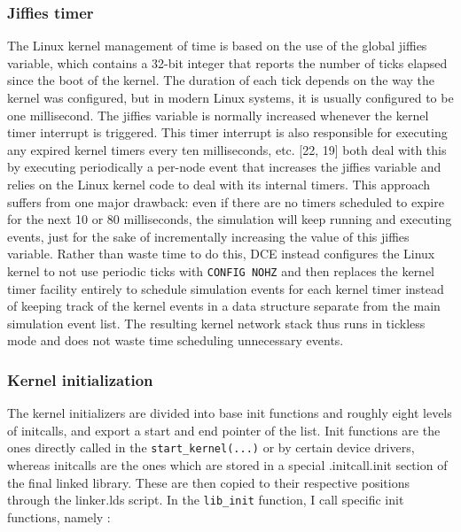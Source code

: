 \documentclass{sig-alternate}
\begin{document}
\subsubsection{Jiffies timer}
The Linux kernel management of time is based on the use of the global jiffies variable,
which contains a 32-bit integer that reports the number of ticks elapsed since the boot of
the kernel. The duration of each tick depends on the way the kernel was configured, but in modern Linux systems, it is usually configured to be one millisecond. The jiffies variable is normally
increased whenever the kernel timer interrupt is triggered. This timer interrupt is also
responsible for executing any expired kernel timers every ten milliseconds, etc.
[22, 19] both deal with this by executing periodically a per-node event that increases
the jiffies variable and relies on the Linux kernel code to deal with its internal timers. This
approach suffers from one major drawback: even if there are no timers scheduled to
expire for the next 10 or 80 milliseconds, the simulation will keep running and executing
events, just for the sake of incrementally increasing the value of this jiffies variable.
Rather than waste time to do this, DCE instead configures the Linux kernel to not use periodic
ticks with \texttt{CONFIG NOHZ} and then replaces the kernel timer facility entirely to schedule
simulation events for each kernel timer instead of keeping track of the kernel events in a
data structure separate from the main simulation event list. The resulting kernel network
stack thus runs in tickless mode and does not waste time scheduling unnecessary events.


\subsubsection{Kernel initialization}
The kernel initializers are divided into base init functions and roughly eight levels of initcalls, and export a start and end pointer of the list. 
Init functions are the ones directly called in the \texttt{start\_kernel(...)} or by certain device drivers, whereas initcalls are the ones which are stored 
in a special .initcall.init section of the final linked library. These are then copied to their respective positions through the linker.lds script.
In the \texttt{lib\_init} function, I call specific init functions, namely : 
\end{document}
